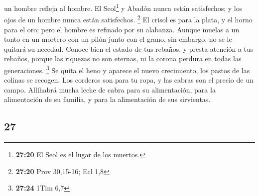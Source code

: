 \begin{paracol}{2}
un hombre refleja al hombre.  El Seol\footnote{\textbf{27:20}
  El Seol es el lugar de los muertos.} y Abadón nunca están satisfechos;
y los ojos de un hombre nunca están satisfechos. \footnote{\textbf{27:20}
  Prov 30,15-16; Ecl 1,8}  El crisol es para la plata, y
el horno para el oro; pero el hombre es refinado por su alabanza.
 Aunque muelas a un tonto en un mortero con un pilón
junto con el grano, sin embargo, no se le quitará su necedad.
 Conoce bien el estado de tus rebaños, y presta atención
a tus rebaños,  porque las riquezas no son eternas, ni la
corona perdura en todas las generaciones. \footnote{\textbf{27:24} 1Tim
  6,7}  Se quita el heno y aparece el nuevo crecimiento,
los pastos de las colinas se recogen.  Los corderos son
para tu ropa, y las cabras son el precio de un campo. 
Allíhabrá mucha leche de cabra para su alimentación, para la
alimentación de su familia, y para la alimentación de sus sirvientas.

\switchcolumn
\begin{otherlanguage}{english}

\hypertarget{section-53}{%
\section{27}\label{section-53}}


\end{otherlanguage}
\end{paracol}
